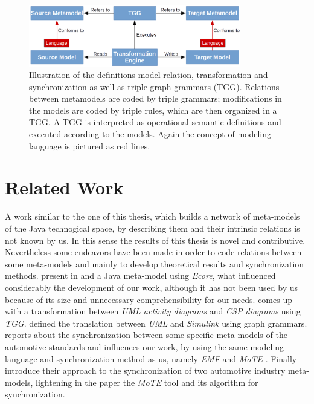 \documentclass[tuberlin,cic,tc,openright,english,noabntcite]{iiufrgs}
\begin{document}
\begin{description}
\begin{figure}[h]
    \caption{Illustration of the definitions model relation, transformation and synchronization as well as triple graph grammars (TGG). Relations between metamodels are coded by triple grammars; modifications in the models are coded by triple rules, which are then organized in a TGG. A TGG is interpreted as operational semantic definitions and executed according to the models. Again the concept of modeling language is pictured as red lines.}
    \begin{center}
        \includegraphics[width=25em]{transformation_scheme}
    \end{center}
    \label{fig:transformation_scheme}
\end{figure}

\end{description}
 
\section{Related Work}
A work similar to the one of this thesis, which builds a network of meta-models of the Java technogical space, by describing them and their intrinsic relations is not known by us. In this sense the results of this thesis is novel and contributive. Nevertheless some endeavors have been made in order to code relations between some meta-models and mainly to develop theoretical results and synchronization methods. \citeauthor{heidenreich2010closing} present in \citeyearpar{heidenreich2009jamopp} and \citeyearpar{heidenreich2010closing} a Java meta-model using \emph{Ecore}, what influenced considerably the development of our work, although it has not been used by us because of its size and unnecessary comprehensibility for our needs. \citet{greenyer2008tggs} comes up with a transformation between \emph{UML activity diagrams} and \emph{CSP diagrams} using \emph{TGG}. \citet{foss2011uml} defined the translation between \emph{UML} and \emph{Simulink} using graph grammars. \citet{blouin2014synchronization} reports about the synchronization between some specific meta-models of the automotive standards and influences our work, by using the same modeling language and synchronization method as us, namely \emph{EMF} \citep{steinberg2008emf} and \emph{MoTE} \citep{giese2010toward}. Finally \citet{giese2010model} introduce their approach to the synchronization of two automotive industry meta-models, lightening in the paper the \emph{MoTE} tool and its algorithm for synchronization.
\end{document}
